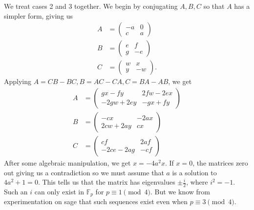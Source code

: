 \documentclass[12pt, letterpaper]{article}
\theoremstyle{definition}
\newcommand{\F}{\mathbb{F}}
\begin{document}
We treat cases 2 and 3 together. We begin by conjugating $A, B, C$ so that $A$ has a simpler form, giving us
\begin{align*}
A &= \begin{pmatrix} -a & 0 \\ c & a \end{pmatrix}\\
B &= \begin{pmatrix} e & f \\ g & -e \end{pmatrix}\\
C &= \begin{pmatrix} w & x \\ y & -w \end{pmatrix}.
\end{align*}
Applying $A=CB-BC, B = AC-CA, C = BA-AB$, we get
\begin{align*}
A &= \begin{pmatrix} gx-fy & 2fw-2ex \\ -2gw+2ey & -gx+fy \end{pmatrix}\\
B &= \begin{pmatrix}
-cx & -2ax \\ 2cw+2ay & cx
\end{pmatrix}\\
C &= \begin{pmatrix}
cf & 2af \\ -2ce-2ag & -cf
\end{pmatrix}
\end{align*}
After some algebraic manipulation, we get $x=-4a^2x$. If $x=0$, the matrices zero out giving us a contradiction so we must assume that $a$ is a solution to $4a^2+1=0$. This tells us that the matrix has eigenvalues $\pm\frac{i}{2}$, where $i^2=-1$. Such an $i$ can only exist in $\F_p$ for $p\equiv 1\pmod 4$. But we know from experimentation on sage that such sequences exist even when $p \equiv 3\pmod 4.$
\end{document}
